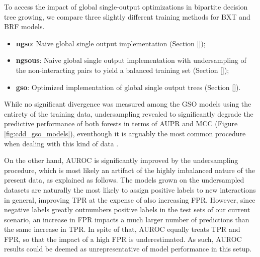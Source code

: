 To access the impact of global single-output optimizations in bipartite decision tree growing, we compare three slightly different training methods for BXT and BRF models.

\begin{itemize}
    \item \textbf{ngso}: Naive global single output implementation (Section \ref{});
    \item \textbf{ngsous}: Naive global single output implementation with undersampling of the non-interacting pairs to yield a balanced training set (Section \ref{});
    \item \textbf{gso}: Optimized implementation of global single output trees (Section \ref{}).
\end{itemize}

While no significant divergence was measured among the GSO models using the entirety of the training data, undersampling revealed to significantly degrade the predictive performance of both forests in terms of AUPR and MCC (Figure \ref{fig:cdd_gso_models}), eventhough it is arguably the most common procedure when dealing with this kind of data \cite{}.

On the other hand, AUROC is significantly improved by the undersampling procedure, which is most likely an artifact of the highly imbalanced nature of the present data, as explained as follows. The models grown on the undersampled datasets are naturally the most likely to assign positive labels to new interactions in general, improving TPR at the expense of also increasing FPR. However, since negative labels greatly outnumbers positive labels in the test sets of our current scenario, an increase in FPR impacts a much larger number of predictions than the same increase in TPR. In spite of that, AUROC equally treats TPR and FPR, so that the impact of a high FPR is underestimated. As such, AUROC results could be deemed as unrepresentative of model performance in this setup.


